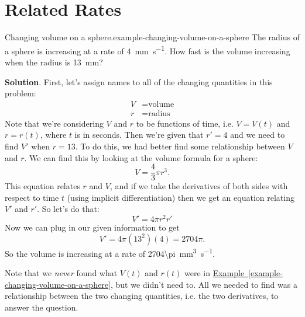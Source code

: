 \documentclass[10pt,]{book}
\numberwithin{equation}{section}
\begin{document}
\section[{Related Rates}]{Related Rates}\label{section-related-rates}
\begin{example}{Changing volume on a sphere.}{example-changing-volume-on-a-sphere}%
\hypertarget{p-169}{}%
The radius of a sphere is increasing at a rate of \SI{4}{\milli\meter\per\second}. How fast is the volume increasing when the radius is \SI{13}{\milli\meter}?%
\par\smallskip%
\noindent\textbf{Solution}.\hypertarget{solution-37}{}\quad%
\hypertarget{p-170}{}%
First, let's assign names to all of the changing quantities in this problem:%
\begin{align*}
V & = \text{volume} \\
r & = \text{radius} 
\end{align*}
Note that we're considering \(V\) and \(r\) to be functions of time, i.e. \(V = V(t)\) and \(r=r(t)\), where \(t\) is in seconds. Then we're given that \(r' = 4\) and we need to find \(V'\) when \(r=13\). To do this, we had better find some relationship between \(V\) and \(r\). We can find this by looking at the volume formula for a sphere:%
\begin{equation*}
V = \frac{4}{3}\pi r^{3}.
\end{equation*}
This equation relates \(r\) and \(V\), and if we take the derivatives of both sides with respect to time \(t\) (using implicit differentiation) then we get an equation relating \(V'\) and \(r'\). So let's do that:%
\begin{equation*}
V' = 4\pi r^{2}r'
\end{equation*}
Now we can plug in our given information to get%
\begin{equation*}
V' = 4\pi(13^{2})(4) = 2704\pi.
\end{equation*}
So the volume is increasing at a rate of \SI{2704\pi}{\milli\meter\tothe{3}\per\second}.%
\end{example}
\hypertarget{p-171}{}%
Note that we \emph{never} found what \(V(t)\) and \(r(t)\) were in \hyperref[example-changing-volume-on-a-sphere]{Example~\ref{example-changing-volume-on-a-sphere}}, but we didn't need to. All we needed to find was a relationship between the two changing quantities, i.e. the two derivatives, to answer the question.%
\end{document}
